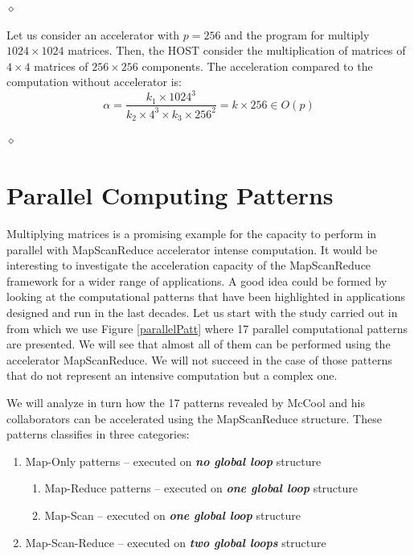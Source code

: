 \begin{exemplu}
$\diamond$
\end{exemplu}

\begin{exemplu}
Let us consider an accelerator with $p=256$ and the program for multiply $1024 \times 1024$ matrices. Then, the HOST consider the multiplication of matrices of $4 \times 4$ matrices of $256 \times 256$ components. The acceleration compared to the computation without accelerator is:
$$\alpha = \frac{k_1 \times 1024^3}{k_2 \times 4^3 \times k_3 \times 256^2} = k \times 256 \in O(p)$$

$\diamond$
\end{exemplu}

\section{Parallel Computing Patterns}\label{parPatterns}

Multiplying matrices is a promising example for the capacity to perform in parallel with MapScanReduce accelerator intense computation. It would be interesting to investigate the acceleration capacity of the MapScanReduce framework for a wider range of applications. A good idea could be formed by looking at the computational patterns that have been highlighted in applications designed and run in the last decades. Let us start with the study carried out in \cite{McCool12} from which we use Figure \ref{parallelPatt} where 17 parallel computational patterns are presented. We will see that almost all of them can be performed using the accelerator MapScanReduce. We will not succeed in the case of those patterns that do not represent an intensive computation but a complex one.


We will analyze in turn how the 17 patterns revealed by McCool and his collaborators can be accelerated using the MapScanReduce structure. These patterns classifies in three categories:
\begin{enumerate}
    \item Map-Only patterns -- executed on {\bf {\em no global loop}} structure
    \begin{enumerate}
        \item Map-Reduce patterns -- executed on {\bf {\em one global loop}} structure
        \item Map-Scan -- executed on {\bf {\em one global loop}} structure
    \end{enumerate}
    \item Map-Scan-Reduce -- executed on {\bf {\em two global loops}} structure
\end{enumerate}

